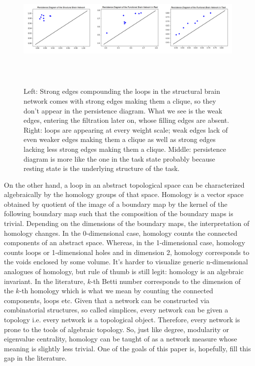\documentclass[9pt,twocolumn,twoside,lineno]{pnas-new}
\begin{document}
\begin{figure}%
\centering
\includegraphics[width=16cm,height=6cm]{peristencediagrams.png}
\caption{Left: Strong edges compounding the loops in the structural brain network comes with strong edges making them a clique, so they don't appear in the persistence diagram. What we see is the weak edges, entering the filtration later on, whose filling edges are absent. Right: loops are appearing at every weight scale; weak edges lack of even weaker edges making them a clique as well as strong edges lacking less strong edges making them a clique. Middle: persistence diagram is more like the one in the task state probably because resting state is the underlying structure of the task.  }
\end{figure}

On the other hand, a loop in an abstract topological space can be characterized algebraically by the homology groups of that space. Homology is a vector space obtained by quotient of the image of a boundary map by the kernel of the following boundary map such that the composition of the boundary maps is trivial\cite{topologyanddata}. Depending on the dimensions of the boundary maps, the interpretation of homology changes. In the 0-dimensional case, homology counts the connected components of an abstract space. Whereas, in the 1-dimensional case, homology counts loops or 1-dimensional holes and in dimension 2, homology corresponds to the voids enclosed by some volume. It's harder to visualize generic n-dimensional analogues of homology, but rule of thumb is still legit: homology is an algebraic invariant. In the literature, $k$-th Betti number corresponds to the dimension of the $k$-th homology which is what we mean by counting the connected components, loops etc. Given that a network can be constructed via combinatorial structures, so called simplices, every network can be given a topology i.e. every network is a topological object. Therefore, every network is prone to the tools of algebraic topology. So, just like degree, modularity or eigenvalue centrality, homology can be taught of as a network measure whose meaning is slightly less trivial. One of the goals of this paper is, hopefully, fill this gap in the literature.
\end{document}
